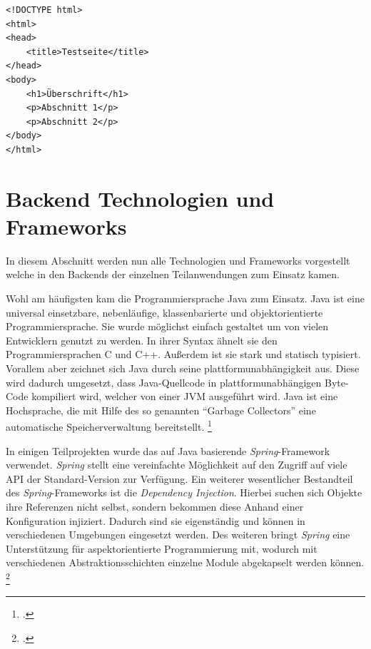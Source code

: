 \begin{scriptsize}
\begin{lstlisting}
<!DOCTYPE html>
<html>
<head>
	<title>Testseite</title>
</head>
<body>
	<h1>Überschrift</h1>
	<p>Abschnitt 1</p>
	<p>Abschnitt 2</p>
</body>
</html>
\end{lstlisting}
\end{scriptsize}


\label{par:javascript}

\section{Backend Technologien und Frameworks}

In diesem Abschnitt werden nun alle Technologien und Frameworks vorgestellt welche in den Backends der einzelnen Teilanwendungen zum Einsatz kamen.

Wohl am häufigsten kam die Programmiersprache Java zum Einsatz. Java ist eine universal einsetzbare, nebenläufige, klassenbarierte und objektorientierte Programmiersprache. Sie wurde möglichst einfach gestaltet um von vielen Entwicklern genutzt zu werden. In ihrer Syntax ähnelt sie den Programmiersprachen C und C++. Außerdem ist sie stark und statisch typisiert. Vorallem aber zeichnet sich Java durch seine plattformunabhängigkeit aus. Diese wird dadurch umgesetzt, dass Java-Quellcode in plattformunabhängigen Byte-Code kompiliert wird, welcher von einer \ac{JVM} ausgeführt wird. Java ist eine Hochsprache, die mit Hilfe des so genannten \enquote{Garbage Collectors} eine automatische Speicherverwaltung bereitstellt. \footcite[Vgl.][1]{javaspecification}

In einigen Teilprojekten wurde das auf Java basierende \textit{Spring}-Framework verwendet. \textit{Spring} stellt eine vereinfachte Möglichkeit auf den Zugriff auf viele \ac{API} der Standard-Version zur Verfügung. Ein weiterer wesentlicher Bestandteil des \textit{Spring}-Frameworks ist die \textit{Dependency Injection}. Hierbei suchen sich Objekte ihre Referenzen nicht selbst, sondern bekommen diese Anhand einer Konfiguration injiziert. Dadurch sind sie eigenständig und können in verschiedenen Umgebungen eingesetzt werden. Des weiteren bringt \textit{Spring} eine Unterstützung für aspektorientierte Programmierung mit, wodurch mit verschiedenen Abstraktionsschichten einzelne Module abgekapselt werden können. \footcite[Vgl.][2]{spring3}

